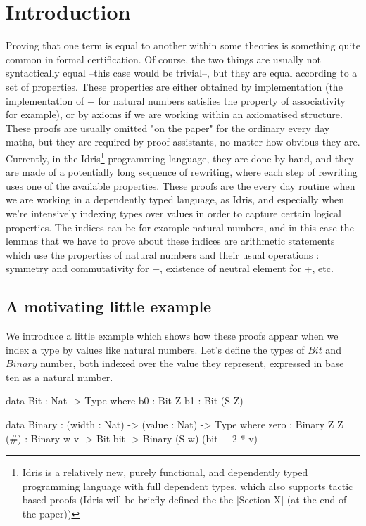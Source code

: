 \section{Introduction}


Proving that one term is equal to another within some theories is something quite common in formal certification. Of course, the two things are usually not syntactically equal --this case would be trivial--, but they are equal according to a set of properties. These properties are either obtained by implementation (the implementation of + for natural numbers satisfies the property of associativity for example), or by axioms if we are working within an axiomatised structure. 
These proofs are usually omitted "on the paper" for the ordinary every day maths, but they are required by proof assistants, no matter how obvious they are. Currently, in the Idris\footnote{Idris is a relatively new, purely functional, and dependently typed programming language with full dependent types, which also supports tactic based proofs  (Idris will be briefly defined the the [Section X] (at the end of the paper))} programming language, they are done by hand, and they are made of a potentially long sequence of rewriting, where each step of rewriting uses one of the available properties. 
These proofs are the every day routine when we are working in a dependently typed language, as Idris, and especially when we're intensively indexing types over values in order to capture certain logical properties.
The indices can be for example natural numbers, and in this case the lemmas that we have to prove about these indices are arithmetic statements which use the properties of natural numbers and their usual operations : symmetry and commutativity for +, existence of neutral element for +, etc.

\subsection{A motivating little example}
We introduce a little example which shows how these proofs appear when we index a type by values like natural numbers.
Let's define the types of $Bit$ and $Binary$ number, both indexed over the value they represent, expressed in base ten as a natural number.
\begin{code}[caption=Bit and binary number, captionpos=b, label=lst1:haskell2]
data Bit : Nat -> Type where
     b0 : Bit Z
     b1 : Bit (S Z)
     
data Binary : (width : Nat) -> (value : Nat) 
              -> Type where
     zero : Binary Z Z
     (#) : Binary w v -> Bit bit 
           -> Binary (S w) (bit + 2 * v)
\end{code}

